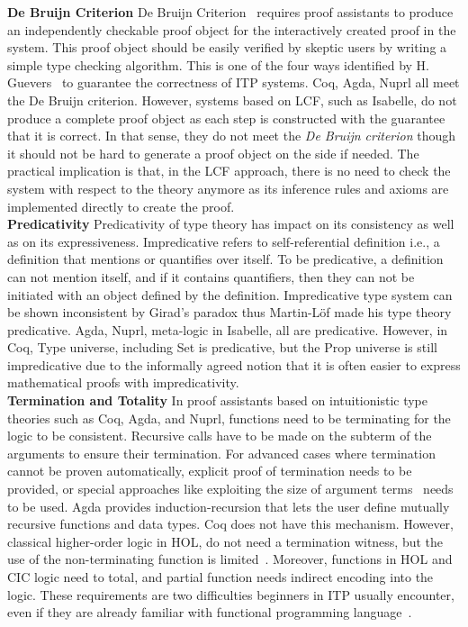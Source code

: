 \textbf{De Bruijn Criterion} 
De Bruijn Criterion~\cite{Barendregt_Geuvers_2001} requires proof assistants to produce an independently checkable proof object for the interactively created proof in the system. This proof object should be easily verified by skeptic users by writing a simple type checking algorithm. This is one of the four ways identified by H. Guevers~\cite{Geuvers_2009} to guarantee the correctness of ITP systems. Coq, Agda, Nuprl all meet the De Bruijn criterion. However, systems based on LCF, such as Isabelle, do not produce a complete proof object as each step is constructed with the guarantee that it is correct. In that sense, they do not meet the \emph{De Bruijn criterion} though it should not be hard to generate a proof object on the side if needed. The practical implication is that, in the LCF approach, there is no need to check the system with respect to the theory anymore as its inference rules and axioms are implemented directly to create the proof. \\

\textbf{Predicativity}
Predicativity of type theory has impact on its consistency as well as on its expressiveness. Impredicative refers to self-referential definition i.e., a definition that mentions or quantifies over itself. To be predicative, a definition can not mention itself, and if it contains quantifiers, then they can not be initiated with an object defined by the definition. Impredicative type system can be shown inconsistent by Girad's paradox thus Martin-L{\"o}f made his type theory predicative. Agda, Nuprl, meta-logic in Isabelle, all are predicative. However, in Coq, Type universe, including Set is predicative, but the Prop universe is still impredicative due to the informally agreed notion that it is often easier to express mathematical proofs with impredicativity. \\

\textbf{Termination and Totality}
In proof assistants based on intuitionistic type theories such as Coq, Agda, and Nuprl, functions need to be terminating for the logic to be consistent. Recursive calls have to be made on the subterm of the arguments to ensure their termination. For advanced cases where termination cannot be proven automatically, explicit proof of termination needs to be provided, or special approaches like exploiting the size of argument terms~\cite{Abel_et_al_2017, Ringer_et_al_2019} needs to be used. Agda provides induction-recursion that lets the user define mutually recursive functions and data types. Coq does not have this mechanism. However, classical higher-order logic in HOL, do not need a termination witness, but the use of the non-terminating function is limited~\cite{Ringer_et_al_2019}. Moreover, functions in HOL and CIC logic need to total, and partial function needs indirect encoding into the logic. These requirements are two difficulties beginners in ITP usually encounter, even if they are already familiar with functional programming language~\cite{Ringer_et_al_2019}. \\

